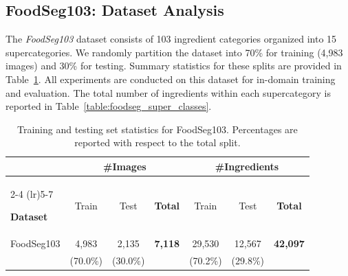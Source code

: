 \documentclass[preprint,12pt]{elsarticle}
\begin{document}
\subsection{FoodSeg103: Dataset Analysis}
The \textit{FoodSeg103}\cite{wu2021large} dataset consists of 103 ingredient categories organized into 15 supercategories. We randomly partition the dataset into 70\% for training (4,983 images) and 30\% for testing. Summary statistics for these splits are provided in Table~\ref{tab:statistics}. All experiments are conducted on this dataset for in-domain training and evaluation. The total number of ingredients within each supercategory is reported in Table~\ref{table:foodseg_super_classes}.

\begin{table}[t]
\centering
\small
\setlength{\tabcolsep}{5pt}
\caption{Training and testing set statistics for FoodSeg103. Percentages are reported with respect to the total split.}
\label{tab:statistics}

\begin{tabular}{l
                c c c
                c c c}
\toprule
 & \multicolumn{3}{c}{\textbf{\#Images}}
 & \multicolumn{3}{c}{\textbf{\#Ingredients}} \\
\cmidrule(lr){2-4} \cmidrule(lr){5-7}

\textbf{Dataset}
 & \multicolumn{1}{c}{Train}
 & \multicolumn{1}{c}{Test}
 & \multicolumn{1}{c}{\textbf{Total}}
 & \multicolumn{1}{c}{Train}
 & \multicolumn{1}{c}{Test}
 & \multicolumn{1}{c}{\textbf{Total}} \\

\midrule
\rowcolor{gray!12}
FoodSeg103
 & 4,983 & 2,135 & \textbf{7,118}
 & 29,530 & 12,567 & \textbf{42,097} \\

\addlinespace[3pt]
 & \multicolumn{1}{c}{\footnotesize(70.0\%)}
 & \multicolumn{1}{c}{\footnotesize(30.0\%)}
 & {}
 & \multicolumn{1}{c}{\footnotesize(70.2\%)}
 & \multicolumn{1}{c}{\footnotesize(29.8\%)}
 & {} \\

\bottomrule
\end{tabular}
\end{table}
\end{document}
